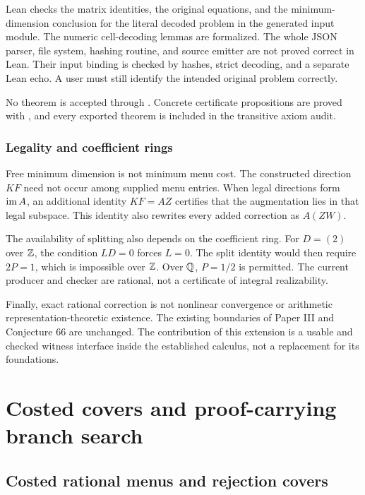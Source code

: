 \begin{scopebox}[title=The precise trust boundary]
Lean checks the matrix identities, the original equations, and the minimum-dimension conclusion for the literal decoded problem in the generated input module. The numeric cell-decoding lemmas are formalized. The whole JSON parser, file system, hashing routine, and source emitter are not proved correct in Lean. Their input binding is checked by hashes, strict decoding, and a separate Lean echo. A user must still identify the intended original problem correctly.

No theorem is accepted through . Concrete certificate propositions are proved with , and every exported theorem is included in the transitive axiom audit.
\end{scopebox}

\subsection{Legality and coefficient rings}
Free minimum dimension is not minimum menu cost. The constructed direction $KF$ need not occur among supplied menu entries. When legal directions form $\operatorname{im} A$, an additional identity $KF=AZ$ certifies that the augmentation lies in that legal subspace. This identity also rewrites every added correction as $A(ZW)$.

The availability of splitting also depends on the coefficient ring. For $D=(2)$ over $\mathbb{Z}$, the condition $LD=0$ forces $L=0$. The split identity would then require $2P=1$, which is impossible over $\mathbb{Z}$. Over $\mathbb{Q}$, $P=1/2$ is permitted. The current producer and checker are rational, not a certificate of integral realizability.

Finally, exact rational correction is not nonlinear convergence or arithmetic representation-theoretic existence. The existing boundaries of Paper III and Conjecture 66 are unchanged. The contribution of this extension is a usable and checked witness interface inside the established calculus, not a replacement for its foundations.


\chapter{Costed covers and proof-carrying branch search}\label{CR:book:chapter-58}
\section{Costed rational menus and rejection covers}\label{CR:cr-source-section-10}
\label{CR:ch:menu-covers}

